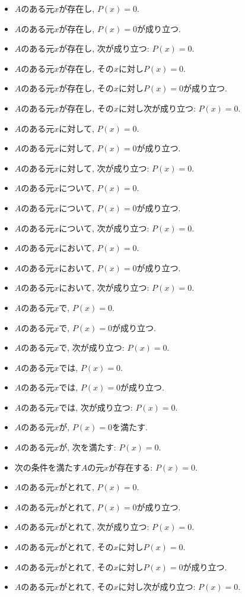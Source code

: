 \documentclass[a4paper,12pt,draft]{amsart}
\newcommand{\PPP}[1]{P(#1)=0}
\begin{document}
\begin{itemize}
\item $A$のある元$x$が存在し, $\PPP{x}$.
\item $A$のある元$x$が存在し, $\PPP{x}$が成り立つ.
\item $A$のある元$x$が存在し, 次が成り立つ: $\PPP{x}$.
\item $A$のある元$x$が存在し, その$x$に対し$\PPP{x}$.
\item $A$のある元$x$が存在し, その$x$に対し$\PPP{x}$が成り立つ.
\item $A$のある元$x$が存在し, その$x$に対し次が成り立つ: $\PPP{x}$.
\item $A$のある元$x$に対して, $\PPP{x}$.
\item $A$のある元$x$に対して, $\PPP{x}$が成り立つ.
\item $A$のある元$x$に対して, 次が成り立つ: $\PPP{x}$.
\item $A$のある元$x$について, $\PPP{x}$.
\item $A$のある元$x$について, $\PPP{x}$が成り立つ.
\item $A$のある元$x$について, 次が成り立つ: $\PPP{x}$.
\item $A$のある元$x$において, $\PPP{x}$.
\item $A$のある元$x$において, $\PPP{x}$が成り立つ.
\item $A$のある元$x$において, 次が成り立つ: $\PPP{x}$.
\item $A$のある元$x$で, $\PPP{x}$.
\item $A$のある元$x$で, $\PPP{x}$が成り立つ.
\item $A$のある元$x$で, 次が成り立つ: $\PPP{x}$.
\item $A$のある元$x$では, $\PPP{x}$.
\item $A$のある元$x$では, $\PPP{x}$が成り立つ.
\item $A$のある元$x$では, 次が成り立つ: $\PPP{x}$.
\item $A$のある元$x$が, $\PPP{x}$を満たす.
\item $A$のある元$x$が, 次を満たす: $\PPP{x}$.
\item 次の条件を満たす$A$の元$x$が存在する: $\PPP{x}$.
\item $A$のある元$x$がとれて, $\PPP{x}$.
\item $A$のある元$x$がとれて, $\PPP{x}$が成り立つ.
\item $A$のある元$x$がとれて, 次が成り立つ: $\PPP{x}$.
\item $A$のある元$x$がとれて, その$x$に対し$\PPP{x}$.
\item $A$のある元$x$がとれて, その$x$に対し$\PPP{x}$が成り立つ.
\item $A$のある元$x$がとれて, その$x$に対し次が成り立つ: $\PPP{x}$.
\end{itemize}
\end{document}
